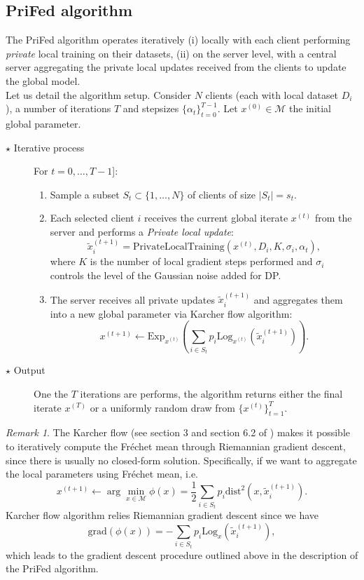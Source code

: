 \documentclass[10pt,a4paper]{book}
\theoremstyle{definition}
\theoremstyle{plain}
\theoremstyle{remark}
\newtheorem{rmk}{Remark}[section]
\newcommand{\grad}{\textrm{grad}}
\newcommand \M {\mathcal{M}}
\begin{document}
\subsection{PriFed algorithm}
The PriFed algorithm operates iteratively (i) locally with each client performing \emph{private} local training on their datasets, (ii) on the server level, with a central server aggregating the private local updates received from the clients to update the global model.
\\ Let us detail the algorithm setup.
Consider $N$ clients (each with local dataset $D_i$), a number of iterations $T$ and stepsizes $\{\alpha_t\}_{t=0}^{T-1}$. Let $x^{(0)}\in \M$ the initial global parameter. 
\begin{description}
\item[$\star$ Iterative process] For $t=0,\dots, T-1$]:
\begin{enumerate}
\item Sample a subset $S_t \subset \{1,\dots, N\}$ of clients of size $|S_t|=s_t$. 
\item Each selected client $i$ receives the current global iterate $x^{(t)}$ from the server and performs
a \emph{Private local update}: 
$$\tilde{x}_i^{(t+1)}=\text{PrivateLocalTraining}(x^{(t)},D_i,K,\sigma_i,\alpha_t),$$
where $K$ is the number of local gradient steps performed and $\sigma_i$ controls the level of the Gaussian noise added for DP.
\item The server receives all private updates $\tilde{x}_i^{(t+1)}$ and aggregates them into a new global parameter via Karcher flow algorithm:
$$x^{(t+1)}\leftarrow \text{Exp}_{x^{(t)}}\left(\sum_{i\in S_t}p_i\text{Log}_{x^{(t)}}(\tilde{x}_i^{(t+1)})\right).$$
\end{enumerate}
\item[$\star$ Output] One the $T$ iterations are performs, the algorithm returns either the final iterate $x^{(T)}$ or a uniformly random draw from $\{x^{(t)}\}_{t=1}^{T}$.
\end{description}
\begin{rmk}
The Karcher flow (see section 3 and section 6.2 of \cite{huang2024federated}) makes it possible to iteratively compute the Fréchet mean through Riemannian gradient descent, since there is usually no closed-form solution. Specifically, if we want to aggregate the local parameters using Fréchet mean, i.e.
\begin{equation}
\label{eq.KF.fed}
x^{(t+1)}\leftarrow \arg \min_{x\in \M}\phi(x) =\frac{1}{2}\sum_{i \in S_t}p_i \text{dist}^2(x,\tilde{x}_i^{(t+1)}).
\end{equation}
Karcher flow algorithm relies Riemannian gradient descent since we have 
\begin{equation}
\label{eq.KF.grad}
\grad \left(\phi(x)\right)=-\sum_{i\in S_t}p_i \text{Log}_{x}(\tilde{x}_i^{(t+1)}),
\end{equation}
which leads to the gradient descent procedure outlined above in the description of the PriFed algorithm. 
\end{rmk}
\end{document}
